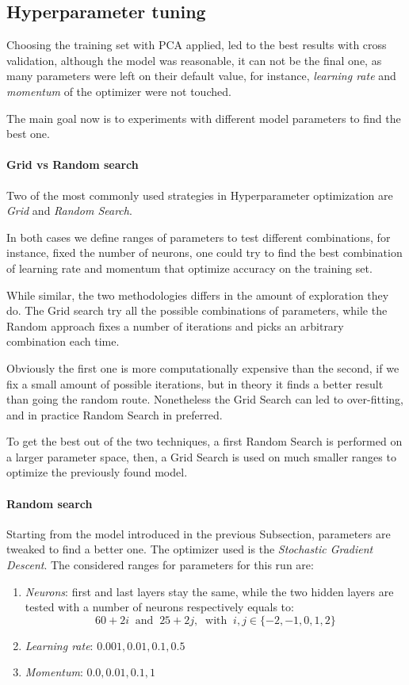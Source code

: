 \subsection{Hyperparameter tuning}

Choosing the training set with PCA applied, led to the best results 
with cross validation, although the model was reasonable, it can not be the 
final one, as many parameters were left on their default value, for instance, 
\emph{learning rate} and \emph{momentum} of the optimizer were not touched. 

The main goal now is to experiments with different model parameters 
to find the best one.

\paragraph{Grid vs Random search}
Two of the most commonly used strategies in Hyperparameter optimization
are \emph{Grid} and \emph{Random Search}. 

In both cases we define ranges of parameters to test different combinations, 
for instance, fixed the number of neurons, one could try to find the best 
combination of learning rate and momentum that optimize accuracy on the training set.

While similar, the two methodologies differs in the amount of exploration they do.
The Grid search try all the possible combinations of parameters, while the 
Random approach fixes a number of iterations and picks an arbitrary combination each time. 

Obviously the first one is more computationally expensive than the second, if 
we fix a small amount of possible iterations, but in theory it finds a better result
than going the random route. 
Nonetheless the Grid Search can led to over-fitting, and in practice Random 
Search in preferred.

To get the best out of the two techniques, a first Random Search is performed 
on a larger parameter space, then, a Grid Search is used on much smaller 
ranges to optimize the previously found model.

\paragraph{Random search}
Starting from the model introduced in the previous Subsection, parameters are 
tweaked to find a better one.
The optimizer used is the \emph{Stochastic Gradient Descent}.
The considered ranges for parameters for this run are: 
\begin{enumerate}
    \item \emph{Neurons}: first and last layers stay the same, while 
    the two hidden layers are tested with a number of neurons respectively 
    equals to: 
    $$60 + 2i\;\;\text{and}\;\;25 + 2j,\;\;\text{with}\;\; i, j \in \{-2,-1,0,1,2\}$$
    \item \emph{Learning rate}: $0.001, 0.01, 0.1, 0.5$
    \item \emph{Momentum}: $0.0, 0.01, 0.1, 1$
\end{enumerate}

